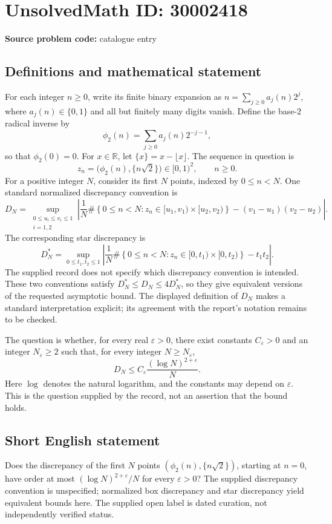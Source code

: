 \documentclass[11pt]{article}
\newcommand{\R}{\mathbb{R}}
\begin{document}
\section*{UnsolvedMath ID: 30002418}
\textbf{Source problem code:} catalogue entry
\subsection{Definitions and mathematical statement}
For each integer \(n\geq 0\), write its finite binary expansion as \(n=\sum_{j\geq 0}a_j(n)2^j\), where \(a_j(n)\in\{0,1\}\) and all but finitely many digits vanish. Define the base-\(2\) radical inverse by
\[
\phi_2(n)=\sum_{j\geq 0}a_j(n)2^{-j-1},
\]
so that \(\phi_2(0)=0\). For \(x\in\R\), let \(\{x\}=x-\lfloor x\rfloor\). The sequence in question is
\[
z_n=\bigl(\phi_2(n),\{n\sqrt{2}\}\bigr)\in[0,1)^2,\qquad n\geq 0.
\]
For a positive integer \(N\), consider its first \(N\) points, indexed by \(0\leq n<N\). One standard normalized discrepancy convention is
\[
D_N=\sup_{\substack{0\leq u_i\leq v_i\leq 1\\i=1,2}}
\left|\frac{1}{N}\#\left\{0\leq n<N:z_n\in[u_1,v_1)\times[u_2,v_2)\right\}-(v_1-u_1)(v_2-u_2)\right|.
\]
The corresponding star discrepancy is
\[
D_N^*=\sup_{0\leq t_1,t_2\leq 1}
\left|\frac{1}{N}\#\left\{0\leq n<N:z_n\in[0,t_1)\times[0,t_2)\right\}-t_1t_2\right|.
\]
The supplied record does not specify which discrepancy convention is intended. These two conventions satisfy \(D_N^*\leq D_N\leq 4D_N^*\), so they give equivalent versions of the requested asymptotic bound. The displayed definition of \(D_N\) makes a standard interpretation explicit; its agreement with the report's notation remains to be checked.

The question is whether, for every real \(\varepsilon>0\), there exist constants \(C_\varepsilon>0\) and an integer \(N_\varepsilon\geq 2\) such that, for every integer \(N\geq N_\varepsilon\),
\[
D_N\leq C_\varepsilon\frac{(\log N)^{2+\varepsilon}}{N}.
\]
Here \(\log\) denotes the natural logarithm, and the constants may depend on \(\varepsilon\). This is the question supplied by the record, not an assertion that the bound holds.
\subsection{Short English statement}
Does the discrepancy of the first \(N\) points \((\phi_2(n),\{n\sqrt{2}\})\), starting at \(n=0\), have order at most \((\log N)^{2+\varepsilon}/N\) for every \(\varepsilon>0\)? The supplied discrepancy convention is unspecified; normalized box discrepancy and star discrepancy yield equivalent bounds here. The supplied open label is dated curation, not independently verified status.
\end{document}
